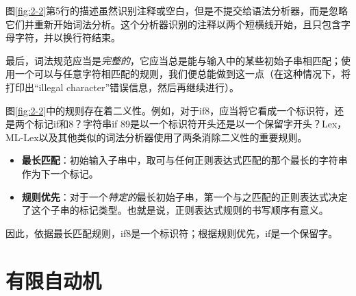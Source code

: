 \documentclass[cn,11pt,chinese]{elegantbook}
\begin{document}
图\ref{fig:2-2}第5行的描述虽然识别注释或空白，但是不提交给语法分析器，而是忽略它们并重新开始词法分析。这个分析器识别的注释以两个短横线开始，且只包含字母字符，并以换行符结束。

最后，词法规范应当是\textit{完整的}，它应当总是能与输入中的某些初始子串相匹配；使用一个可以与任意字符相匹配的规则，我们便总能做到这一点（在这种情况下，将打印出“illegal character”错误信息，然后再继续进行）。

图\ref{fig:2-2}中的规则存在着二义性。例如，对于if8，应当将它看成一个标识符，还是两个标记if和8？字符串if 89是以一个标识符开头还是以一个保留字开头？Lex，ML-Lex以及其他类似的词法分析器使用了两条消除二义性的重要规则。

\begin{itemize}
  \item \textbf{最长匹配}：初始输入子串中，取可与任何正则表达式匹配的那个最长的字符串作为下一个标记。
  \item \textbf{规则优先}：对于一个\textit{特定的}最长初始子串，第一个与之匹配的正则表达式决定了这个子串的标记类型。也就是说，正则表达式规则的书写顺序有意义。
\end{itemize}

因此，依据最长匹配规则，if8是一个标识符；根据规则优先，if是一个保留字。

\section{有限自动机}
\end{document}

